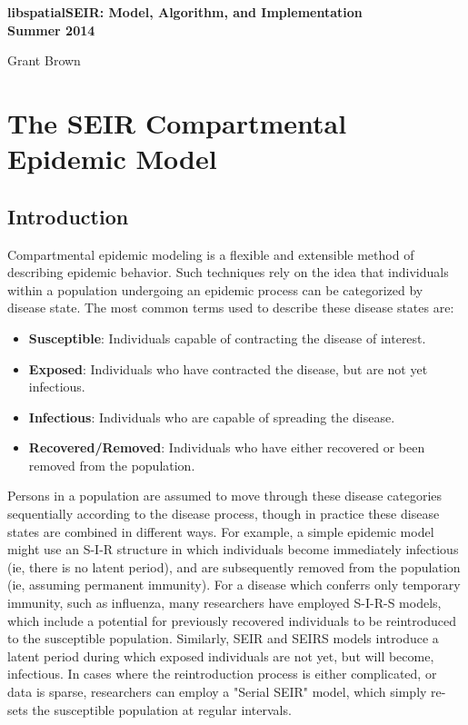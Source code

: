 \documentclass[12pt]{article}
\newcommand \noi {\noindent}
\begin{document}
\begin{center}    
    \noi \bf libspatialSEIR: Model, Algorithm, and Implementation\\
    \vspace{.05in}
    \noi Summer 2014\\
    \vspace{.05in}

    \vspace{.15in}
    \noi Grant Brown\\ 

\end{center}
\section{The SEIR Compartmental Epidemic Model}
\subsection{Introduction}
Compartmental epidemic modeling is a flexible and extensible method of describing epidemic behavior.  
Such techniques rely on the idea that individuals within a population undergoing an epidemic process 
can be categorized by disease state. The most common terms used to describe these disease states are: \\ 

\begin{itemize}
    \item {\bf{Susceptible}}: Individuals capable of contracting the disease of interest. 
    \item {\bf{Exposed}}: Individuals who have contracted the disease, but are not yet infectious. 
    \item {\bf{Infectious}}: Individuals who are capable of spreading the disease.  
    \item {\bf{Recovered/Removed}}: Individuals who have either recovered or been removed from the population. 
\end{itemize}

Persons in a population are assumed to move through these disease categories sequentially according to the 
disease process, though in practice these disease states are combined in different ways. For example, a simple epidemic model
might use an S-I-R structure in which individuals become immediately infectious (ie, there is no latent period), and 
are subsequently removed from the population (ie, assuming permanent immunity). For a disease which conferrs only 
temporary immunity, such as influenza, many
researchers have employed S-I-R-S models, which include a potential for previously recovered individuals to be reintroduced
to the susceptible population. Similarly, SEIR and SEIRS models introduce a latent period during which exposed individuals
are not yet, but will become, infectious. In cases where the reintroduction process is either complicated, or data is sparse, 
researchers can employ a "Serial SEIR" model, which simply re-sets the susceptible population at regular intervals.\\ 
\end{document}
